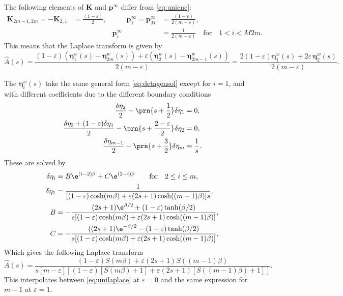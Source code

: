 \documentclass[12pt]{article}
\newcommand{\pr}{\mathbf{p}}
\newcommand{\eq}{\pr^\infty}
\newcommand{\etw}{\boldsymbol{\eta}^w}
\newcommand{\enc}{\mathbf{K}}
\begin{document}
The following elements of $\enc$ and $\eq$ differ from \eqref{eq:unienc}:
%
\begin{equation}\label{eq:shortenenc}
  \begin{aligned}
  \enc_{2m-1,2m} = -\enc_{2,1} &= \frac{(1-\varepsilon)}{2},
  &\qquad
  \eq_1 = \eq_M &= \frac{(1-\varepsilon)}{2(m-\varepsilon)},
  \\ &&
  \eq_i &=  \frac{1}{2(m-\varepsilon)}
  \quad\text{for}\quad 1<i<M2m.
  \end{aligned}
\end{equation}
%
This means that the Laplace transform is given by
%
\begin{equation}\label{eq:shortenareaeta}
  \hat{A}(s) = \frac{(1-\varepsilon)(\etw_1(s)-\etw_{2m}(s)) 
                      + \varepsilon(\etw_2(s)-\etw_{2m-1}(s))}
                    {2(m-\varepsilon)}
       = \frac{2(1-\varepsilon) \etw_1(s) + 2\varepsilon\,\etw_2(s)}
              {2(m-\varepsilon)}.
\end{equation}
%

The $\etw_i(s)$ take the same general form \eqref{eq:detagensol} except for $i=1$, and with different coefficients due to the different boundary conditions
%
\begin{equation}\label{eq:detabndshorten}
\begin{aligned}
  \frac{\delta\eta_2}{2} - \prn{s+\frac{1}{2}}\delta\eta_1 &= 0, \\
  \frac{\delta\eta_3 + (1-\varepsilon)\delta\eta_1}{2} - \prn{s+\frac{2-\varepsilon}{2}}\delta\eta_2 &= 0, \\
  \frac{\delta\eta_{m-1}}{2} - \prn{s+\frac{3}{2}}\delta\eta_{m} &= \frac{1}{s}.
\end{aligned}
\end{equation}
%
These are solved by
%
%
\begin{equation}\label{eq:shortensol}
\begin{aligned}
  \delta\eta_i &= B\e^{(i-2)\beta} + C\e^{(2-i)\beta} \qquad
        \text{for} \quad 2 \leq i \leq m, \\
  \delta\eta_1 &= \frac{1}
         {[(1-\varepsilon)\cosh(m\beta) + \varepsilon(2s+1)\cosh((m-1)\beta)]s}, \\
  B &= - \frac{(2s+1) \e^{\beta/2} + (1-\varepsilon) \tanh(\beta/2)}
         {s [(1-\varepsilon)\cosh(m\beta) + \varepsilon(2s+1)\cosh((m-1)\beta)]}, \\
  C &= - \frac{((2s+1) \e^{-\beta/2} - (1-\varepsilon) \tanh(\beta/2)}
         {s [(1-\varepsilon)\cosh(m\beta) + \varepsilon(2s+1)\cosh((m-1)\beta)]}, \\
\end{aligned}
\end{equation}
%
Which gives the following Laplace transform
%
\begin{equation}\label{eq:shortenlaplace}
  \hat{A}(s) = \frac{(1-\varepsilon) S(m\beta) + \varepsilon(2s+1) S((m-1)\beta)}
          { s [m-\varepsilon]
            [(1-\varepsilon)[S(m\beta) + 1] + \varepsilon(2s+1)[S((m-1)\beta) + 1]] }.
\end{equation}
%
This interpolates between \eqref{eq:unilaplace} at $\varepsilon=0$ and the same expression for $m-1$ at $\varepsilon=1$.
\end{document}
